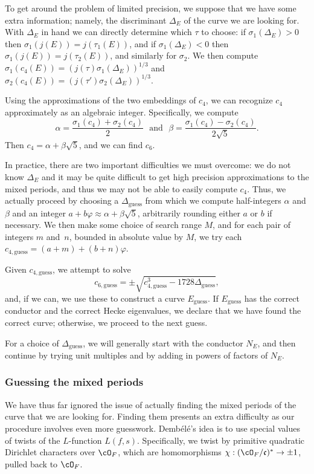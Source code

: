 \documentclass{amsart}
\newcommand{\fc}{\mathfrak{c}}
\newcommand{\OF}{\cO_F}
\newcommand{\dembele}{Demb\'el{\'e}\xspace}
\begin{document}
To get around the problem of limited precision, we suppose that we have some extra information; 
namely, the discriminant $\Delta_E$ of the curve we are looking for.  With $\Delta_E$ in
hand we can directly determine which $\tau$ to choose: if $\sigma_1(\Delta_E) > 0$ then
$\sigma_1(j(E)) = j(\tau_1(E))$, and if $\sigma_1(\Delta_E) < 0$ then $\sigma_1(j(E)) = j(\tau_2(E))$,
and similarly for $\sigma_2$. We then compute
$\sigma_1(c_4(E)) = (j(\tau) \sigma_1(\Delta_E))^{1/3}$
and $\sigma_2(c_4(E)) = (j(\tau') \sigma_2(\Delta_E))^{1/3}$.

Using the approximations of the two embeddings of $c_4$, we can recognize $c_4$ approximately
as an algebraic integer. Specifically, we compute
\[
    \alpha = \frac{\sigma_1(c_4) + \sigma_2(c_4)}{2}\ \ \  \text{and} \ \ \ 
    \beta = \frac{\sigma_1(c_4) - \sigma_2(c_4)}{2\sqrt{5}}.
\]
Then $c_4 = \alpha + \beta\sqrt{5}$, and we can find $c_6$.

\newcommand{\Deltaguess}{\Delta_{\textrm{guess}}}
\newcommand{\cfourguess}{c_{4,\textrm{guess}}}
\newcommand{\csixguess}{c_{6,\textrm{guess}}}
\newcommand{\Eguess}{E_\textrm{guess}}

In practice, there are two important difficulties we must overcome: we do not know
$\Delta_E$ and it may be quite difficult to get high precision approximations to the
mixed periods, and thus we may not be able to easily compute $c_4$. Thus, we actually
proceed by choosing a $\Deltaguess$ from which we
compute half-integers $\alpha$ and $\beta$ and an integer
$a + b\varphi \approx \alpha + \beta\sqrt5$, arbitrarily rounding either $a$ or $b$ if necessary.
We then make some choice of search range $M$, and for each pair of integers $m$ and~$n$,
bounded in absolute value by $M$, we try each $\cfourguess = (a + m) + (b + n)\varphi$.

Given $\cfourguess$, we attempt to solve
\[
    \csixguess = \pm \sqrt{ \cfourguess^3 - 1728 \Deltaguess },
\]
and, if we can, we use these to construct a curve $\Eguess$. If $\Eguess$ has
the correct conductor and the correct Hecke eigenvalues, we declare that
we have found the correct curve; otherwise, we proceed to the next guess.

For a choice of $\Deltaguess$, we will generally start with the conductor $N_E$,
and then continue by trying unit multiples and by adding in powers of factors of $N_E$.

\subsubsection{Guessing the mixed periods}
We have thus far ignored the issue of actually finding the mixed periods of the curve that
we are looking for. Finding them presents an extra difficulty as our procedure involves
even more guesswork. \dembele's idea is to use special values of twists of the $L$-function
$L(f, s)$. Specifically, we twist by primitive quadratic Dirichlet characters over $\OF$,
which are homomorphisms $\chi : (\OF/\fc)^* \rightarrow \pm1$, pulled back to $\OF$.
\end{document}
